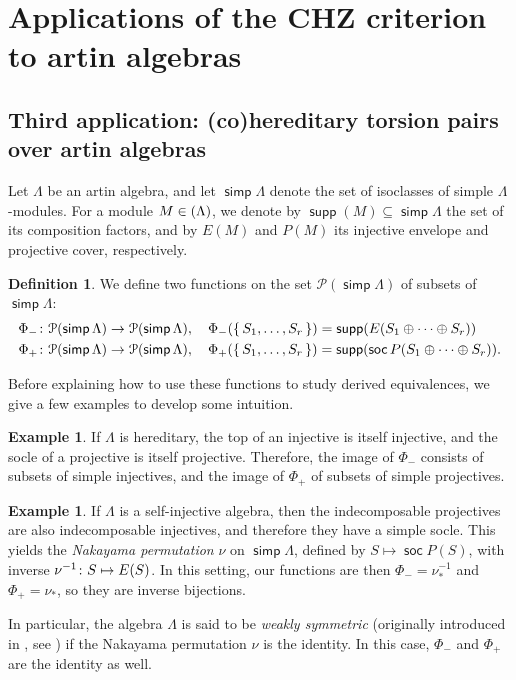 \documentclass[a4paper,11pt]{amsart}
\theoremstyle{plain}
\theoremstyle{definition}
\newtheorem{dfn}[thm]{Definition}
\newtheorem{ex}[thm]{Example}
\newcommand{\Pcal}{\mathcal{P}} \newcommand{\Qcal}{\mathcal{Q}} \newcommand{\Rcal}{\mathcal{R}}
\DeclareMathOperator{\simp}{\mathsf{simp}}
\DeclareMathOperator{\soc}{\mathsf{soc}}
\let\top\relax
\DeclareMathOperator{\top}{\mathsf{top}}
\let\mod\relax
\DeclareMathOperator{\mod}{\mathsf{mod}}
\DeclareMathOperator{\supp}{\mathsf{supp}}
\begin{document}
\section{Applications of the CHZ criterion to artin algebras}
\label{sec:artin-applications}

\subsection{Third application: (co)hereditary torsion pairs over artin algebras}
\label{subsec:cohereditary}

Let $\Lambda$ be an artin algebra, and let $\simp\Lambda$ denote the set of
isoclasses of simple $\Lambda$-modules. For a module $M\in\mod(\Lambda)$, we
denote by $\supp(M)\subseteq\simp\Lambda$ the set of its composition factors,
and by $E(M)$ and $P(M)$ its injective envelope and projective cover,
respectively.

\begin{dfn}
	We define two functions on the set $\Pcal(\simp\Lambda)$ of subsets of $\simp\Lambda$:
	\begin{align*}
		\Phi_-&\colon \Pcal(\simp\Lambda)\to \Pcal(\simp\Lambda),
		\quad \Phi_-(\{\,S_1,\dots,S_r\,\})=\supp(\top E(S_1\oplus\cdots\oplus S_r))
		\\
		\Phi_+&\colon \Pcal(\simp\Lambda)\to \Pcal(\simp\Lambda),
		\quad \Phi_+(\{\,S_1,\dots,S_r\,\})=\supp(\soc P(S_1\oplus\cdots\oplus S_r)).
	\end{align*}
\end{dfn}

Before explaining how to use these functions to study derived equivalences, we
give a few examples to develop some intuition.

\begin{ex}
	If $\Lambda$ is hereditary, the top of an injective is itself injective,
	and the socle of a projective is itself projective.
	Therefore, the image of $\Phi_-$ consists of subsets of simple injectives, and
	the image of $\Phi_+$ of subsets of simple projectives.
\end{ex}

\begin{ex}\label{ex:self-injective}
	If $\Lambda$ is a self-injective algebra, then the indecomposable
	projectives are also indecomposable injectives, and therefore they have a
	simple socle. This yields the \emph{Nakayama permutation} $\nu$ on
	$\simp\Lambda$, defined by $S\mapsto \soc P(S)$, with inverse $\nu^{-1}\colon
	S\mapsto \top E(S)$. In this setting, our functions are then $\Phi_-=\nu^{-1}_\ast$
	and $\Phi_+=\nu_\ast$, so they are inverse bijections.

	In particular, the algebra $\Lambda$ is said to be \emph{weakly symmetric}
	(originally introduced in \cite{naka-nesb-38}, see
	\cite[p.~378]{skow-yama-11}) if the Nakayama permutation $\nu$ is the identity. In this case,
	$\Phi_-$ and $\Phi_+$ are the identity as well.
\end{ex}
\end{document}
